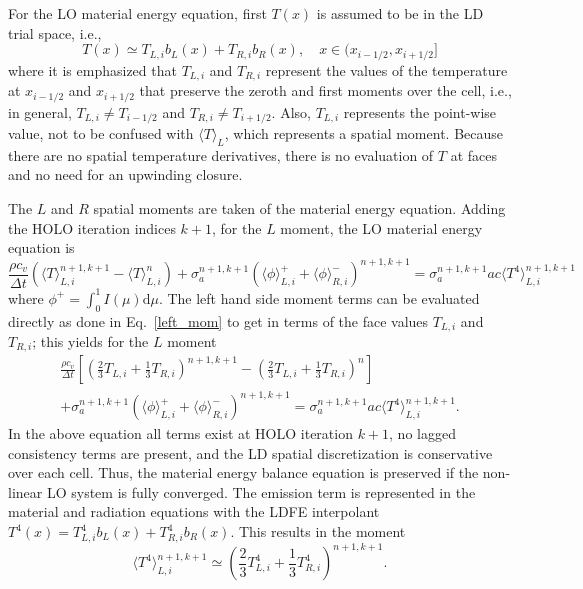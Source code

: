 \documentclass{mc2013}
\renewcommand{\d}{\mathrm{d}}
\newcommand{\mom}[1]{\langle #1 \rangle}
\newcommand{\il}{{i-1/2}}
\newcommand{\ir}{{i+1/2}}
\begin{document}

For the LO material energy equation, first $T(x)$ is assumed to be in the LD trial space, i.e.,
\begin{equation}
    T(x) \simeq T_{L,i} b_L(x) + T_{R,i} b_R(x),\quad x\in(x_{i-1/2},x_\ir]
\end{equation}
where it is emphasized that $T_{L,i}$ and $T_{R,i}$ represent the values of the temperature
at $x_\il$ and $x_\ir$ that preserve the zeroth and first moments over the cell,
i.e., in general, $T_{L,i}\neq T_\il$ and $T_{R,i}\neq T_\ir$. Also, $T_{L,i}$
represents the point-wise value, not to be confused with $\mom{T}_L$, which
represents a spatial moment.
Because there are no
spatial temperature derivatives, there is no evaluation of $T$ at faces and no need for an
upwinding closure.  

 The $L$ and
$R$ spatial moments are taken of the material energy equation. Adding the HOLO iteration
indices $k+1$, for the $L$ moment, the LO material energy equation is
\begin{equation}
\frac{\rho c_v}{\Delta t} \left( \mom{T}^{n+1,k+1}_{L,i} - \mom{T}^{n}_{L,i} \right) +
\sigma_a^{n+1,k+1} \left( \mom{\phi}_{L,i}^+ + \mom{\phi}_{R,i}^- \right)^{n+1,k+1} = \sigma_a^{n+1,k+1} a c
\mom{ T^4}_{L,i}^{n+1,k+1}
\end{equation}
where $\phi^+ = \int_0^1 I(\mu) \d \mu$. The left hand side moment terms can be evaluated directly as done in
Eq.~\eqref{left_mom} to get in terms of the face values $T_{L,i}$ and $T_{R,i}$;  this
yields for the $L$ moment
\begin{multline}
    \frac{\rho c_v}{\Delta t}\left[ \left(\frac{2}{3}T_{L,i} + \frac{1}{3}T_{R,i}
        \right)^{n+1,k+1} - \left(\frac{2}{3}T_{L,i} + \frac{1}{3}T_{R,i}
    \right)^{n} \right] \\ + \sigma_a^{n+1,k+1} \left( \mom{\phi}_{L,i}^+ + \mom{\phi}_{R,i}^- \right)^{n+1,k+1} = \sigma_a^{n+1,k+1}a c
\mom{ T^4}_{L,i}^{n+1,k+1}.
\end{multline}
In the above equation all terms exist at HOLO iteration $k+1$, no lagged consistency
terms are present, and the LD spatial discretization is conservative over each
cell.  Thus, the material energy balance equation is preserved
if the non-linear LO system is fully converged.
The emission term  is represented in the material and radiation equations with the LDFE
interpolant $T^4(x) = T_{L,i}^4 b_{L}(x) + T_{R,i}^4 b_R(x)$.  This results in 
the moment
\begin{equation}\label{nodeplanck}
    \mom{ T^4}_{L,i}^{n+1,k+1} \simeq \left( \frac{2}{3} T_{L,i}^4 + \frac{1}{3}T_{R,i}^4
        \right)^{n+1,k+1}.
\end{equation}
\end{document}
